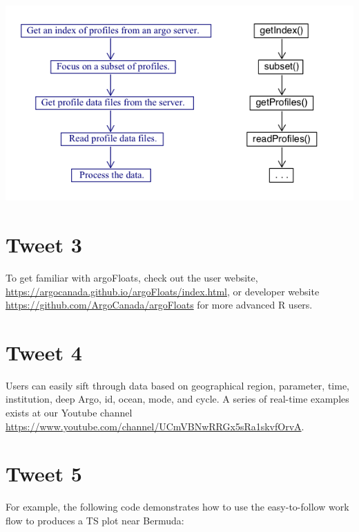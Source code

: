 \documentclass[
]{article}
\begin{document}
\includegraphics{../../../vignettes/flowchart.png}

\hypertarget{tweet-3}{%
\section{Tweet 3}\label{tweet-3}}

To get familiar with argoFloats, check out the user website,
\url{https://argocanada.github.io/argoFloats/index.html}, or developer
website \url{https://github.com/ArgoCanada/argoFloats} for more advanced
R users.

\hypertarget{tweet-4}{%
\section{Tweet 4}\label{tweet-4}}

Users can easily sift through data based on geographical region,
parameter, time, institution, deep Argo, id, ocean, mode, and cycle. A
series of real-time examples exists at our Youtube channel
\url{https://www.youtube.com/channel/UCmVBNwRRGx5sRa1skvfOrvA}.

\hypertarget{tweet-5}{%
\section{Tweet 5}\label{tweet-5}}

For example, the following code demonstrates how to use the
easy-to-follow work flow to produces a TS plot near Bermuda:
\end{document}
